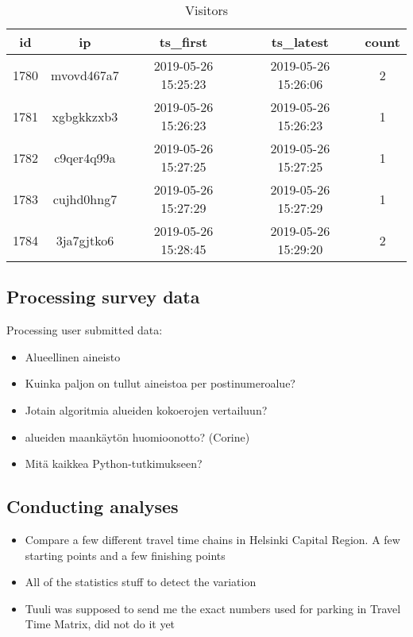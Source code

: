 \begin{table}[!htbp]
    \begin{centering}
        \begin{tabular}{|c c c c c|} 
            \hline
            id & ip & ts\_first & ts\_latest & count \\ [0.5ex] 
            \hline\hline
            1780 & mvovd467a7 & 2019-05-26 15:25:23 & 2019-05-26 15:26:06 & 2 \\ [0.25ex] 
            \hline
            1781 & xgbgkkzxb3 & 2019-05-26 15:26:23 & 2019-05-26 15:26:23 & 1 \\ [0.25ex] 
            \hline
            1782 & c9qer4q99a & 2019-05-26 15:27:25 & 2019-05-26 15:27:25 & 1 \\ [0.25ex]
            \hline
            1783 & cujhd0hng7 & 2019-05-26 15:27:29 & 2019-05-26 15:27:29 & 1 \\ [0.25ex] 
            \hline
            1784 & 3ja7gjtko6 & 2019-05-26 15:28:45 & 2019-05-26 15:29:20 & 2 \\ [1ex]
            \hline
        \end{tabular}
        \caption{Visitors} \label{tab:visitortab}
    \end{centering}
\end{table}

\subsection{Processing survey data}
\justify
Processing user submitted data:
\begin{itemize}
  \item Alueellinen aineisto
  \item Kuinka paljon on tullut aineistoa per postinumeroalue?
  \item Jotain algoritmia alueiden kokoerojen vertailuun?
  \item alueiden maankäytön huomioonotto? (Corine)
  \item Mitä kaikkea Python-tutkimukseen?
\end{itemize}

\subsection{Conducting analyses}
\justify
\begin{itemize}
  \item Compare a few different travel time chains in Helsinki Capital Region. A few starting points and a few finishing points
  \item All of the statistics stuff to detect the variation 
  \item Tuuli was supposed to send me the exact numbers used for parking in Travel Time Matrix, did not do it yet
\end{itemize}